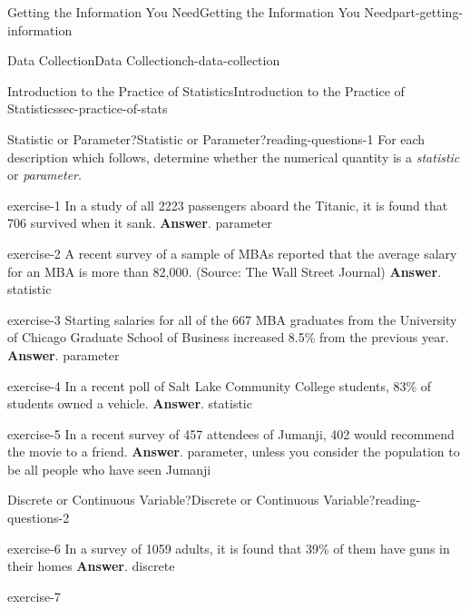 \documentclass[oneside,10pt,]{book}
\numberwithin{equation}{section}
\begin{document}
\begin{partptx}{Getting the Information You Need}{}{Getting the Information You Need}{}{}{part-getting-information}
\begin{chapterptx}{Data Collection}{}{Data Collection}{}{}{ch-data-collection}
\begin{sectionptx}{Introduction to the Practice of Statistics}{}{Introduction to the Practice of Statistics}{}{}{sec-practice-of-stats}
\begin{reading-questions-subsection-numberless}{Statistic or Parameter?}{}{Statistic or Parameter?}{}{}{reading-questions-1}
\hypertarget{p-3}{}%
For each description which follows, determine whether the numerical quantity is a \emph{statistic} or \emph{parameter}.%
\begin{divisionexercise}{1}{}{}{exercise-1}%
In a study of all 2223 passengers aboard the Titanic, it is found that 706 survived when it sank. \textbf{Answer}.\hypertarget{answer-1}{}\quad%
parameter\end{divisionexercise}%
\begin{divisionexercise}{2}{}{}{exercise-2}%
A recent survey of a sample of MBAs reported that the average salary for an MBA is more than \textdollar{}82,000. (Source: The Wall Street Journal) \textbf{Answer}.\hypertarget{answer-2}{}\quad%
statistic\end{divisionexercise}%
\begin{divisionexercise}{3}{}{}{exercise-3}%
Starting salaries for all of the 667 MBA graduates from the University of Chicago Graduate School of Business increased 8.5\% from the previous year. \textbf{Answer}.\hypertarget{answer-3}{}\quad%
parameter\end{divisionexercise}%
\begin{divisionexercise}{4}{}{}{exercise-4}%
In a recent poll of Salt Lake Community College students, 83\% of students owned a vehicle. \textbf{Answer}.\hypertarget{answer-4}{}\quad%
statistic\end{divisionexercise}%
\begin{divisionexercise}{5}{}{}{exercise-5}%
In a recent survey of 457 attendees of Jumanji, 402 would recommend the movie to a friend. \textbf{Answer}.\hypertarget{answer-5}{}\quad%
parameter, unless you consider the population to be all people who have seen Jumanji\end{divisionexercise}%
\end{reading-questions-subsection-numberless}
%
%
\typeout{************************************************}
\typeout{************************************************}
%
\begin{reading-questions-subsection-numberless}{Discrete or Continuous Variable?}{}{Discrete or Continuous Variable?}{}{}{reading-questions-2}
\begin{divisionexercise}{1}{}{}{exercise-6}%
In a survey of 1059 adults, it is found that 39\% of them have guns in their homes \textbf{Answer}.\hypertarget{answer-6}{}\quad%
discrete\end{divisionexercise}%
\begin{divisionexercise}{2}{}{}{exercise-7}%

\end{divisionexercise}
\end{reading-questions-subsection-numberless}
\end{sectionptx}
\end{chapterptx}
\end{partptx}
\end{document}
